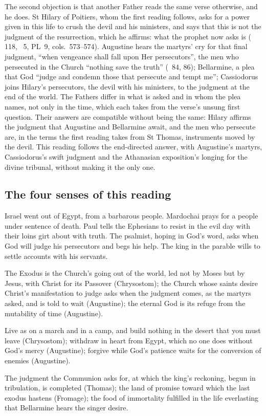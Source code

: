 The second objection is that another Father reads the same verse otherwise, and
he does. St Hilary of Poitiers, whom the first reading follows, asks for a power
given in this life to crush the devil and his ministers, and says that this is not
the judgment of the resurrection, which he affirms: what the prophet now asks is
( 118, ~5, PL~9, cols.~573--574).
Augustine hears the martyrs' cry for that final judgment, ``when vengeance shall
fall upon Her persecutors'', the men who persecuted in the Church ``nothing save
the truth'' (~84, 86); Bellarmine, a plea that God ``judge and condemn
those that persecute and tempt me''; Cassiodorus joins Hilary's persecutors, the
devil with his ministers, to the judgment at the end of the world. The Fathers
differ in what is asked and in whom the plea names, not only in the time, which
each takes from the verse's unsung first question. Their answers are compatible
without being the same: Hilary affirms the judgment that Augustine and Bellarmine
await, and the men who persecute are, in the terms the first reading takes from
St Thomas, instruments moved by the devil. This reading follows the end-directed
answer, with Augustine's martyrs, Cassiodorus's swift judgment and the Athanasian
exposition's longing for the divine tribunal, without making it the only one.

\subsection{The four senses of this reading}

\begin{fourSenses}
\item[Literal.] Israel went out of Egypt, from a barbarous people. Mardochai prays
for a people under sentence of death. Paul tells the Ephesians to resist in the
evil day with their loins girt about with truth. The psalmist, hoping in God's
word, asks when God will judge his persecutors and begs his help. The king in the
parable wills to settle accounts with his servants.
\item[Allegorical.] The Exodus is the Church's going out of the world, led not by
Moses but by Jesus, with Christ for its Passover (Chrysostom); the Church whose
saints desire Christ's manifestation to judge asks when the judgment comes, as
the martyrs asked, and is told to wait (Augustine); the eternal God is its refuge
from the mutability of time (Augustine).
\item[Moral.] Live as on a march and in a camp, and build nothing in the desert
that you must leave (Chrysostom); withdraw in heart from Egypt, which no one does
without God's mercy (Augustine); forgive while God's patience waits for the
conversion of enemies (Augustine).
\item[Anagogical.] The judgment the Communion asks for, at which the king's
reckoning, begun in tribulation, is completed (Thomas); the land of promise toward
which the last exodus hastens (Fromage); the food of immortality fulfilled in the
life everlasting that Bellarmine hears the singer desire.
\end{fourSenses}
